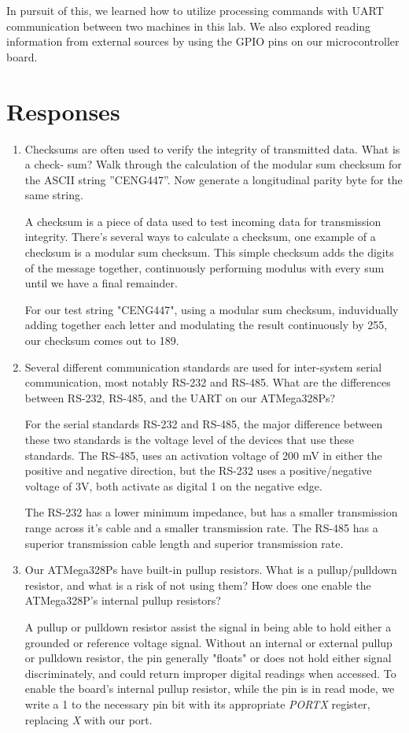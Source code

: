 \documentclass[letterpaper,11pt]{texMemo} %
\begin{document}
    In pursuit of this, we learned how to utilize processing commands with UART communication between two 
machines in this lab. We also explored reading information from external sources by using the GPIO pins 
on our microcontroller board.


\newpage
\section*{Responses}
\begin{enumerate}
    \item Checksums are often used to verify the integrity of transmitted data. What is a check-
sum? Walk through the calculation of the modular sum checksum for the ASCII string
”CENG447”. Now generate a longitudinal parity byte for the same string.
 
    A checksum is a piece of data used to test incoming data for transmission 
integrity. There's several ways to calculate a checksum, one example of a checksum is a 
modular sum checksum. This simple checksum adds the digits of the message together, continuously
performing modulus with every sum until we have a final remainder.

    For our test string "CENG447", using a modular sum checksum, induvidually
adding together each letter and modulating the result continuously by 255, our checksum comes out
to 189.

    \item Several different communication standards are used for inter-system serial communication,
most notably RS-232 and RS-485. What are the differences between RS-232, RS-485, and the
UART on our ATMega328Ps?

    For the serial standards RS-232 and RS-485, the major difference between these two standards is
the voltage level of the devices that use these standards. The RS-485, uses an activation voltage of
200 mV in either the positive and negative direction, but the RS-232 uses a positive/negative voltage
of 3V, both activate as digital 1 on the negative edge.

    The RS-232 has a lower minimum impedance, but has a smaller transmission range across it's cable
and a smaller transmission rate. The RS-485 has a superior transmission cable length and superior
transmission rate.

    \item Our ATMega328Ps have built-in pullup resistors. What is a pullup/pulldown resistor, and
what is a risk of not using them? How does one enable the ATMega328P’s internal pullup
resistors?

    A pullup or pulldown resistor assist the signal in being able to hold either a grounded or
reference voltage signal. Without an internal or external pullup or pulldown resistor, the pin
generally "floats" or does not hold either signal discriminately, and could return improper
digital readings when accessed. To enable the board's internal pullup resistor, while the pin
is in read mode, we write a 1 to the necessary pin bit with its appropriate \textit{PORTX} 
register, replacing \textit{X} with our port.

\end{enumerate}
\end{document}
